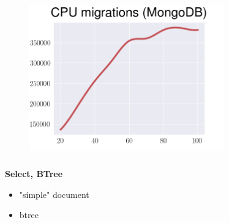 \documentclass[usenames,dvipsnames, 18pt, compress, aspectratio=169]{beamer}
\begin{document}
\begin{frame}
    \frametitle{}
    \begin{center}
    \vspace{10pt}
    \begin{figure}
        \includegraphics[width=0.75\textwidth,center]{benchmarks/mongodb_cpu_migrations.png}
    \end{figure}
    \end{center}
\end{frame}


\begin{frame}
    \frametitle{}
    \begin{center}
        \textbf{Select, BTree }
        \begin{itemize}[label={}]
            \item "simple" document
            \item btree
        \end{itemize}
    \end{center}
\end{frame}
\end{document}
